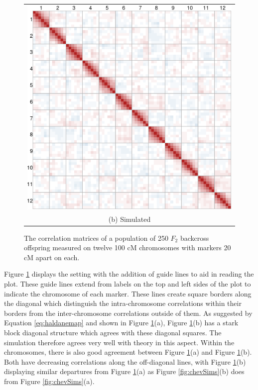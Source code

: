 \documentclass[sts]{imsart}
\begin{document}
\begin{figure}[h!]
\begin{center}
\begin{tabular}{c}
      \includegraphics[scale=0.35]{../img/LBSim.png} \\
      {\footnotesize (b) Simulated} \\
    \end{tabular}
  \end{center}
  \caption{The correlation matrices of a population of 250 $F_2$ backcross offspring measured on twelve 100 cM chromosomes with markers 20 cM apart on each.}
  \label{fig:LBSims}
\end{figure}

Figure \ref{fig:LBSims} displays the \cite{LanderBotstein1989} setting with the addition of guide lines to aid in reading the plot. These guide lines extend from labels on the top and left sides of the plot to indicate the chromosome of each marker. These lines create square borders along the diagonal which distinguish the intra-chromosome correlations within their borders from the inter-chromosome correlations outside of them. As suggested by Equation \ref{eq:haldanemap} and shown in Figure \ref{fig:LBSims}(a), Figure \ref{fig:LBSims}(b) has a stark block diagonal structure which agrees with these diagonal squares. The simulation therefore agrees very well with theory in this aspect. Within the chromosomes, there is also good agreement between Figure \ref{fig:LBSims}(a) and Figure \ref{fig:LBSims}(b). Both have decreasing correlations along the off-diagonal lines, with Figure \ref{fig:LBSims}(b) displaying similar departures from Figure \ref{fig:LBSims}(a) as Figure \ref{fig:chevSims}(b) does from Figure \ref{fig:chevSims}(a).
\end{document}
